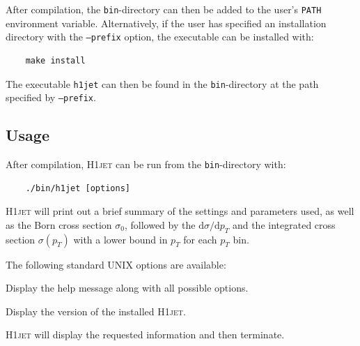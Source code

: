 \documentclass[12pt]{article}
\begin{document}
After compilation, the \texttt{bin}-directory can then be added to the
user's \texttt{PATH} environment variable. Alternatively, if the user
has specified an installation directory with the \texttt{--prefix}
option, the executable can be installed with:
\begin{lstlisting}
	make install  
\end{lstlisting}
The executable \texttt{h1jet} can then be found in the \texttt{bin}-directory at the path specified by \texttt{--prefix}. 

\subsection{Usage} 
After compilation, \textsc{H1jet} can be run from the \texttt{bin}-directory with: 
\begin{lstlisting}
	./bin/h1jet [options]  
\end{lstlisting}
\textsc{H1jet} will print out a brief summary of the settings
and parameters used, as well as the Born cross section
$\sigma_0$, followed by the $\mathrm{d}\sigma/\mathrm{d}p_{T}$
and the integrated cross section $\sigma(p_{T})$ with a lower
bound in $p_T$ for each $p_T$ bin.

      \noindent      
The following standard UNIX options are available: 
\begin{description}[labelindent=\parindent, labelwidth =\widthof{\bfseries9999999999999999999999}, leftmargin = !] 
	\item[\texttt{-h, --help}] Display the help message along with all possible options. 
	\item[\texttt{-v, --version}] Display the version of the installed \textsc{H1jet}. 
\end{description}
\textsc{H1jet} will display the requested information and then terminate. 
\end{document}
